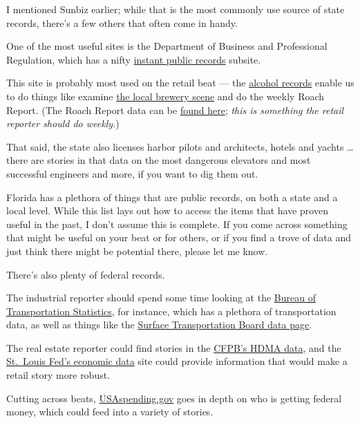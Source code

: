 \documentclass[
  11pt,
  american,
  letterpaperpaper,
  extrafontsizes,onecolumn,openright
  ]{memoir}
\newlength{\rf}
\begin{document}
I mentioned Sunbiz earlier; while that is the most commonly use source of state records, there's a few others that often come in handy.

One of the most useful sites is the Department of Business and Professional Regulation, which has a nifty \href{http://www.myfloridalicense.com/dbpr/instant-public-records/}{instant public records} subsite.

This site is probably most used on the retail beat --- the \href{http://www.myfloridalicense.com/DBPR/alcoholic-beverages-and-tobacco/public-records/}{alcohol records} enable us to do things like examine \href{https://reportertim.github.io/breweries_data.html}{the local brewery scene} and do the weekly Roach Report. (The Roach Report data can be \href{http://www.myfloridalicense.com/DBPR/hotels-restaurants/public-records/\#1506344763000-101d4ee5-7a59}{found here}; \emph{this is something the retail reporter should do weekly.})

That said, the state also licenses harbor pilots and architects, hotels and yachts \ldots{} there are stories in that data on the most dangerous elevators and most successful engineers and more, if you want to dig them out.

Florida has a plethora of things that are public records, on both a state and a local level. While this list lays out how to access the items that have proven useful in the past, I don't assume this is complete. If you come across something that might be useful on your beat or for others, or if you find a trove of data and just think there might be potential there, please let me know.

There's also plenty of federal records.

The industrial reporter should spend some time looking at the \href{https://transtats.bts.gov/}{Bureau of Transportation Statistics}, for instance, which has a plethora of transportation data, as well as things like the \href{https://transtats.bts.gov/}{Surface Transportation Board data page}.

The real estate reporter could find stories in the \href{https://www.consumerfinance.gov/data-research/hmda/historic-data/}{CFPB's HDMA data}, and the \href{https://fred.stlouisfed.org/}{St.~Louis Fed's economic data} site could provide information that would make a retail story more robust.

Cutting across beats, \href{https://www.usaspending.gov/}{USAspending.gov} goes in depth on who is getting federal money, which could feed into a variety of stories.
\end{document}
